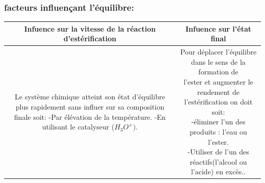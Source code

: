 \documentclass[12pt]{article}
\begin{document}
			 \subsubsection{ facteurs influençant l'équilibre:}
\begin{center}
\begin{tabular}{||c|c||} 
 \hline
 \makecell{Infuence sur la vitesse de la réaction\\d'estérification}&Infuence sur l'état final\\\hline 
 \makecell{ Le système chimique atteint son état\\d'équilibre plus
rapidement sans influer sur\\sa composition finale soit:\\-Par élévation de la température.
\\-En utilisant le catalyseur ($H_3O^+)$.}

																	&  \makecell{Pour déplacer l'équilibre dans le sens de la formation de \\l'ester et augmenter le rendement de l'estérification on doit
\\soit:
\\-éliminer l'un des produits : l’eau ou l’ester.
\\-Utiliser de l'un des réactifs(l'alcool ou l'acide) en excès..}\\  
 \hline
 \hline
\end{tabular}
\end{center}
\end{document}
